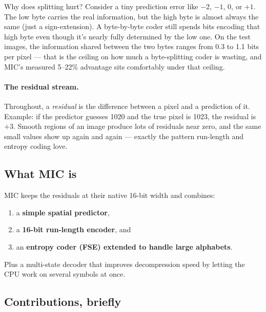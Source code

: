 \documentclass[11pt]{article}
\begin{document}
Why does splitting hurt? Consider a tiny prediction error like $-2$, $-1$, 0,
or $+1$. The low byte carries the real information, but the high byte is
almost always the same (just a sign-extension). A byte-by-byte coder still
spends bits encoding that high byte even though it's nearly fully
determined by the low one. On the test images, the information shared
between the two bytes ranges from 0.3 to 1.1 bits per pixel --- that is the
ceiling on how much a byte-splitting coder is wasting, and MIC's measured
5--22\% advantage sits comfortably under that ceiling.

\paragraph{The residual stream.} Throughout, a \emph{residual} is the
difference between a pixel and a prediction of it. Example: if the predictor
guesses 1020 and the true pixel is 1023, the residual is $+3$. Smooth regions
of an image produce lots of residuals near zero, and the same small values show
up again and again --- exactly the pattern run-length and entropy coding love.

\subsection{What MIC is}

MIC keeps the residuals at their native 16-bit width and combines:

\begin{enumerate}
  \item a \textbf{simple spatial predictor},
  \item a \textbf{16-bit run-length encoder}, and
  \item an \textbf{entropy coder (FSE) extended to handle large alphabets}.
\end{enumerate}

Plus a multi-state decoder that improves decompression speed by letting the
CPU work on several symbols at once.

\subsection{Contributions, briefly}
\end{document}
